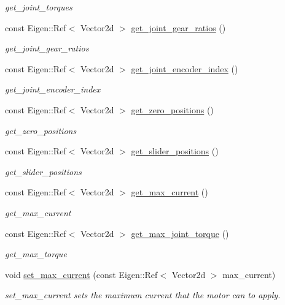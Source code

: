 \begin{DoxyCompactItemize}
\begin{DoxyCompactList}\small\item\em get\+\_\+joint\+\_\+torques \end{DoxyCompactList}\item 
const Eigen\+::\+Ref$<$ Vector2d $>$ \hyperlink{classblmc__robots_1_1SingleLeg_ac697752c8bd67dc1f58360dbe46e57a6}{get\+\_\+joint\+\_\+gear\+\_\+ratios} ()
\begin{DoxyCompactList}\small\item\em get\+\_\+joint\+\_\+gear\+\_\+ratios \end{DoxyCompactList}\item 
const Eigen\+::\+Ref$<$ Vector2d $>$ \hyperlink{classblmc__robots_1_1SingleLeg_a3048925f67d4585e45200e6de05b73ac}{get\+\_\+joint\+\_\+encoder\+\_\+index} ()
\begin{DoxyCompactList}\small\item\em get\+\_\+joint\+\_\+encoder\+\_\+index \end{DoxyCompactList}\item 
const Eigen\+::\+Ref$<$ Vector2d $>$ \hyperlink{classblmc__robots_1_1SingleLeg_a010c3169b55ae8bab809efaa986987a3}{get\+\_\+zero\+\_\+positions} ()
\begin{DoxyCompactList}\small\item\em get\+\_\+zero\+\_\+positions \end{DoxyCompactList}\item 
const Eigen\+::\+Ref$<$ Vector2d $>$ \hyperlink{classblmc__robots_1_1SingleLeg_aa0b97287dcf0195fe918e1b4c0e7b470}{get\+\_\+slider\+\_\+positions} ()
\begin{DoxyCompactList}\small\item\em get\+\_\+slider\+\_\+positions \end{DoxyCompactList}\item 
const Eigen\+::\+Ref$<$ Vector2d $>$ \hyperlink{classblmc__robots_1_1SingleLeg_a662082708a0f24a120306e07490a0b70}{get\+\_\+max\+\_\+current} ()
\begin{DoxyCompactList}\small\item\em get\+\_\+max\+\_\+current \end{DoxyCompactList}\item 
const Eigen\+::\+Ref$<$ Vector2d $>$ \hyperlink{classblmc__robots_1_1SingleLeg_ace93cc10397888f07ecf5e14583535f9}{get\+\_\+max\+\_\+joint\+\_\+torque} ()
\begin{DoxyCompactList}\small\item\em get\+\_\+max\+\_\+torque \end{DoxyCompactList}\item 
void \hyperlink{classblmc__robots_1_1SingleLeg_a54007e95c258ec05b63169f202d3a3a0}{set\+\_\+max\+\_\+current} (const Eigen\+::\+Ref$<$ Vector2d $>$ max\+\_\+current)
\begin{DoxyCompactList}\small\item\em set\+\_\+max\+\_\+current sets the maximum current that the motor can to apply. \end{DoxyCompactList}\end{DoxyCompactItemize}
